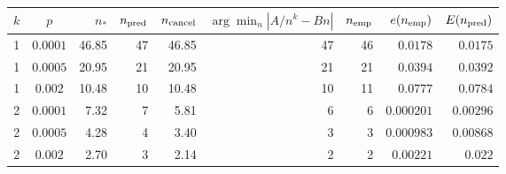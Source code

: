 \begin{tabular}{ccrrrrrrr}
\toprule
$k$ & $p$ & $n_*$ & $n_{\rm pred}$ & $n_{\rm cancel}$ & $\arg\min_n |A/n^k-Bn|$ & $n_{\rm emp}$ & $e(n_{\rm emp})$ & $E(n_{\rm pred})$\\
\midrule
1 & $0.0001$ & 46.85 & 47 & 46.85 & 47 & 46 & $0.0178$ & $0.0175$ \\ 
1 & $0.0005$ & 20.95 & 21 & 20.95 & 21 & 21 & $0.0394$ & $0.0392$ \\ 
1 & $0.002$ & 10.48 & 10 & 10.48 & 10 & 11 & $0.0777$ & $0.0784$ \\ 
2 & $0.0001$ & 7.32 & 7 & 5.81 & 6 & 6 & $0.000201$ & $0.00296$ \\ 
2 & $0.0005$ & 4.28 & 4 & 3.40 & 3 & 3 & $0.000983$ & $0.00868$ \\ 
2 & $0.002$ & 2.70 & 3 & 2.14 & 2 & 2 & $0.00221$ & $0.022$ \\ 
\bottomrule
\end{tabular}
